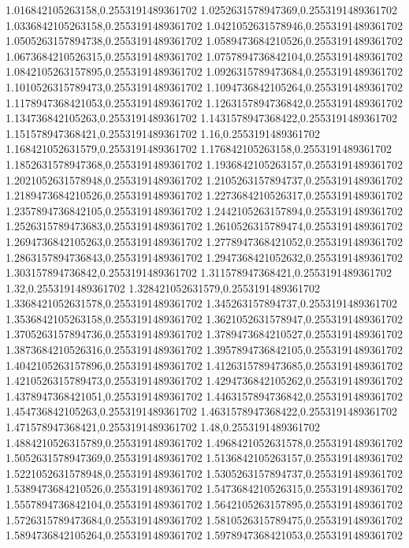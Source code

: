 1.016842105263158,0.2553191489361702
1.0252631578947369,0.2553191489361702
1.0336842105263158,0.2553191489361702
1.0421052631578946,0.2553191489361702
1.0505263157894738,0.2553191489361702
1.0589473684210526,0.2553191489361702
1.0673684210526315,0.2553191489361702
1.0757894736842104,0.2553191489361702
1.0842105263157895,0.2553191489361702
1.0926315789473684,0.2553191489361702
1.1010526315789473,0.2553191489361702
1.1094736842105264,0.2553191489361702
1.1178947368421053,0.2553191489361702
1.1263157894736842,0.2553191489361702
1.134736842105263,0.2553191489361702
1.1431578947368422,0.2553191489361702
1.151578947368421,0.2553191489361702
1.16,0.2553191489361702
1.168421052631579,0.2553191489361702
1.176842105263158,0.2553191489361702
1.1852631578947368,0.2553191489361702
1.1936842105263157,0.2553191489361702
1.2021052631578948,0.2553191489361702
1.2105263157894737,0.2553191489361702
1.2189473684210526,0.2553191489361702
1.2273684210526317,0.2553191489361702
1.2357894736842105,0.2553191489361702
1.2442105263157894,0.2553191489361702
1.2526315789473683,0.2553191489361702
1.2610526315789474,0.2553191489361702
1.2694736842105263,0.2553191489361702
1.2778947368421052,0.2553191489361702
1.2863157894736843,0.2553191489361702
1.2947368421052632,0.2553191489361702
1.303157894736842,0.2553191489361702
1.311578947368421,0.2553191489361702
1.32,0.2553191489361702
1.328421052631579,0.2553191489361702
1.3368421052631578,0.2553191489361702
1.345263157894737,0.2553191489361702
1.3536842105263158,0.2553191489361702
1.3621052631578947,0.2553191489361702
1.3705263157894736,0.2553191489361702
1.3789473684210527,0.2553191489361702
1.3873684210526316,0.2553191489361702
1.3957894736842105,0.2553191489361702
1.4042105263157896,0.2553191489361702
1.4126315789473685,0.2553191489361702
1.4210526315789473,0.2553191489361702
1.4294736842105262,0.2553191489361702
1.4378947368421051,0.2553191489361702
1.4463157894736842,0.2553191489361702
1.454736842105263,0.2553191489361702
1.4631578947368422,0.2553191489361702
1.471578947368421,0.2553191489361702
1.48,0.2553191489361702
1.4884210526315789,0.2553191489361702
1.4968421052631578,0.2553191489361702
1.5052631578947369,0.2553191489361702
1.5136842105263157,0.2553191489361702
1.5221052631578948,0.2553191489361702
1.5305263157894737,0.2553191489361702
1.5389473684210526,0.2553191489361702
1.5473684210526315,0.2553191489361702
1.5557894736842104,0.2553191489361702
1.5642105263157895,0.2553191489361702
1.5726315789473684,0.2553191489361702
1.5810526315789475,0.2553191489361702
1.5894736842105264,0.2553191489361702
1.5978947368421053,0.2553191489361702
